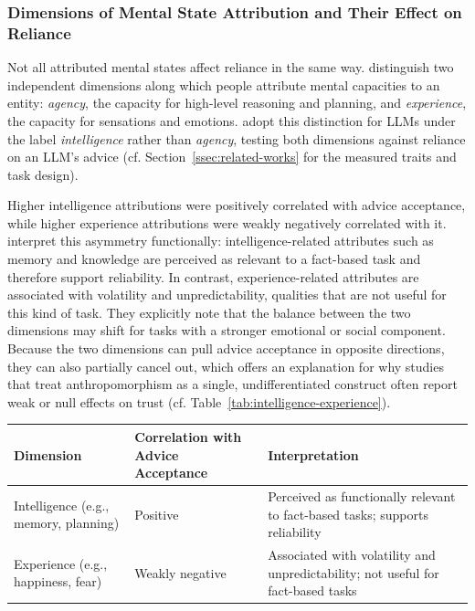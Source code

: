 \subsubsection*{Dimensions of Mental State Attribution and Their Effect on Reliance}

Not all attributed mental states affect reliance in the same way. \textcite{Gray2007} distinguish two independent dimensions along which people attribute mental capacities to an entity: \textit{agency}, the capacity for high-level reasoning and planning, and \textit{experience}, the capacity for sensations and emotions. \textcite{Colombatto2025} adopt this distinction for \acp{LLM} under the label \textit{intelligence} rather than \textit{agency}, testing both dimensions against reliance on an \ac{LLM}'s advice (cf. Section~\ref{ssec:related-works} for the measured traits and task design).

Higher intelligence attributions were positively correlated with advice acceptance, while higher experience attributions were weakly negatively correlated with it. \textcite{Colombatto2025} interpret this asymmetry functionally: intelligence-related attributes such as memory and knowledge are perceived as relevant to a fact-based task and therefore support reliability. In contrast, experience-related attributes are associated with volatility and unpredictability, qualities that are not useful for this kind of task. They explicitly note that the balance between the two dimensions may shift for tasks with a stronger emotional or social component. Because the two dimensions can pull advice acceptance in opposite directions, they can also partially cancel out, which offers an explanation for why studies that treat anthropomorphism as a single, undifferentiated construct often report weak or null effects on trust (cf. Table~\ref{tab:intelligence-experience}).

\begin{ctable}
    \centering
    \begin{tabularx}{\textwidth}{p{4.5cm} p{3.7cm} X}
        \toprule
        \textbf{Dimension} & \textbf{Correlation with Advice Acceptance} & \textbf{Interpretation} \\
        \midrule
        Intelligence (e.g., memory, planning) & Positive & Perceived as functionally relevant to fact-based tasks; supports reliability \\
        \addlinespace
        Experience (e.g., happiness, fear) & Weakly negative & Associated with volatility and unpredictability; not useful for fact-based tasks \\
        \bottomrule
    \end{tabularx}
    \caption[Dimensions of mental state attribution and their effect on advice acceptance]{The two dimensions of mental state attribution identified by \textcite{Colombatto2025}, adapted from \textcite{Gray2007}, and their differentiated relationship to advice acceptance. The balance between the two dimensions is task-dependent and may shift for tasks with a stronger emotional or social component.}
    \label{tab:intelligence-experience}
\end{ctable}

